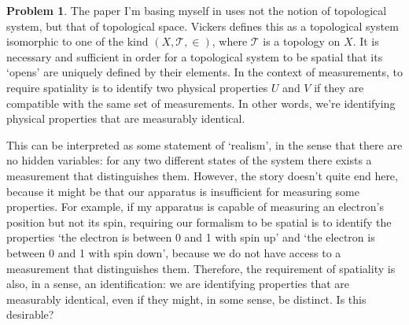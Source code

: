 \documentclass{article}
\theoremstyle{definition}
\newtheorem{problem}{Problem}
\begin{document}
\begin{problem}
The paper I'm basing myself in \cite{measurement} uses not the notion of topological system, but that of topological space. Vickers defines this as a topological system isomorphic to one of the kind $(X, \mathcal{T}, \in)$, where $\mathcal{T}$ is a topology on $X$. It is necessary and sufficient in order for a topological system to be spatial that its `opens' are uniquely defined by their elements. In the context of measurements, to require spatiality is to identify two physical properties $U$ and $V$ if they are compatible with the same set of measurements. In other words, we're identifying physical properties that are measurably identical.

This can be interpreted as some statement of `realism', in the sense that there are no hidden variables: for any two different states of the system there exists a measurement that distinguishes them. However, the story doesn't quite end here, because it might be that our apparatus is insufficient for measuring some properties. For example, if my apparatus is capable of measuring an electron's position but not its spin, requiring our formalism to be spatial is to identify the properties `the electron is between 0 and 1 with spin up' and `the electron is between 0 and 1 with spin down', because we do not have access to a measurement that distinguishes them. Therefore, the requirement of spatiality is also, in a sense, an identification: we are identifying properties that are measurably identical, even if they might, in some sense, be distinct. Is this desirable?
\end{problem}
\end{document}
